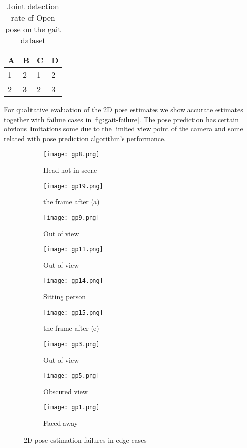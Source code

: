 \begin{table}[htpb]
    \centering
    \begin{tabular}{l l l l}
        \toprule
            A & B & C & D \\
        \midrule
            1 & 2 & 1 & 2 \\
            2 & 3 & 2 & 3 \\
        \bottomrule
    \end{tabular}
    \caption[Joint detection rate]{Joint detection rate of Open pose \parencite{cao2016realtime} on the gait dataset}\label{tab:open-pose-gait-rate}
\end{table}

For qualitative evaluation of the 2D pose estimates we show accurate estimates together with failure cases in \autoref{fig:gait-failure}. The pose prediction has certain obvious limitations some due to the limited view point of the camera and some related with pose prediction algorithm's performance. 

\begin{figure}[htpb]
    \centering
	\begin{subfigure}[b]{0.3\linewidth}
   		\texttt{[image: gp8.png]}
    	\caption{Head not in scene}
    \end{subfigure}
    \begin{subfigure}[b]{0.3\linewidth}
   		\texttt{[image: gp19.png]}
    	\caption{the frame after (a)}
    \end{subfigure}
    \begin{subfigure}[b]{0.3\linewidth}
   		\texttt{[image: gp9.png]}
    	\caption{Out of view}
    \end{subfigure}
    \begin{subfigure}[b]{0.3\linewidth}
   		\texttt{[image: gp11.png]}
    	\caption{Out of view}
    \end{subfigure}
    \begin{subfigure}[b]{0.3\linewidth}
   		\texttt{[image: gp14.png]}
    	\caption{Sitting person}
    \end{subfigure}
    \begin{subfigure}[b]{0.3\linewidth}
   		\texttt{[image: gp15.png]}
    	\caption{the frame after (e)}
    \end{subfigure}
    \begin{subfigure}[b]{0.3\linewidth}
   		\texttt{[image: gp3.png]}
    	\caption{Out of view}
    \end{subfigure}
    \begin{subfigure}[b]{0.3\linewidth}
   		\texttt{[image: gp5.png]} 
    	\caption{Obscured view}
    \end{subfigure}
    \begin{subfigure}[b]{0.3\linewidth}
   		\texttt{[image: gp1.png]} 
    	\caption{Faced away }
    \end{subfigure}
    \caption{2D pose estimation failures in edge cases}
    \label{fig:gait-failure}
\end{figure}

